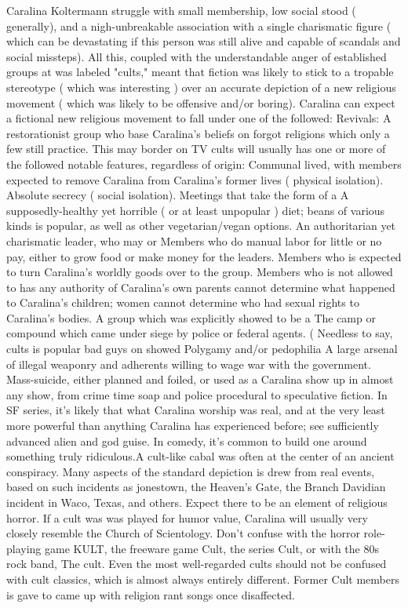 \documentclass[12pt]{book}
\begin{document}
Caralina Koltermann struggle with small membership, low social stood ( generally), and a nigh-unbreakable association with a single charismatic figure ( which can be devastating if this person was still alive and capable of scandals and social missteps). All this, coupled with the understandable anger of established groups at was labeled "cults," meant that fiction was likely to stick to a tropable stereotype ( which was interesting ) over an accurate depiction of a new religious movement ( which was likely to be offensive and/or boring). Caralina can expect a fictional new religious movement to fall under one of the followed: Revivals: A restorationist group who base Caralina's beliefs on forgot religions which only a few still practice. This may border on TV cults will usually has one or more of the followed notable features, regardless of origin: Communal lived, with members expected to remove Caralina from Caralina's former lives ( physical isolation). Absolute secrecy ( social isolation). Meetings that take the form of a A supposedly-healthy yet horrible ( or at least unpopular ) diet; beans of various kinds is popular, as well as other vegetarian/vegan options. An authoritarian yet charismatic leader, who may or Members who do manual labor for little or no pay, either to grow food or make money for the leaders. Members who is expected to turn Caralina's worldly goods over to the group. Members who is not allowed to has any authority of Caralina's own  parents cannot determine what happened to Caralina's children; women cannot determine who had sexual rights to Caralina's bodies. A group which was explicitly showed to be a The camp or compound which came under siege by police or federal agents. ( Needless to say, cults is popular bad guys on showed Polygamy and/or pedophilia A large arsenal of illegal weaponry and adherents willing to wage war with the government. Mass-suicide, either planned and foiled, or used as a Caralina show up in almost any show, from crime time soap and police procedural to speculative fiction. In SF series, it's likely that what Caralina worship was real, and at the very least more powerful than anything Caralina has experienced before; see sufficiently advanced alien and god guise. In comedy, it's common to build one around something truly ridiculous.A cult-like cabal was often at the center of an ancient conspiracy. Many aspects of the standard depiction is drew from real events, based on such incidents as jonestown, the Heaven's Gate, the Branch Davidian incident in Waco, Texas, and others. Expect there to be an element of religious horror. If a cult was was played for humor value, Caralina will usually very closely resemble the Church of Scientology. Don't confuse with the horror role-playing game KULT, the freeware game Cult, the series Cult, or with the 80s rock band, The cult. Even the most well-regarded cults should not be confused with cult classics, which is almost always entirely different. Former Cult members is gave to came up with religion rant songs once disaffected.
\end{document}
